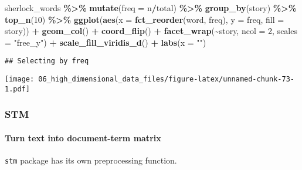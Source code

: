 \documentclass[
]{book}
\newenvironment{Shaded}{\begin{snugshade}}{\end{snugshade}}
\newcommand{\DataTypeTok}[1]{\textcolor[rgb]{0.13,0.29,0.53}{#1}}
\newcommand{\DecValTok}[1]{\textcolor[rgb]{0.00,0.00,0.81}{#1}}
\newcommand{\KeywordTok}[1]{\textcolor[rgb]{0.13,0.29,0.53}{\textbf{#1}}}
\newcommand{\NormalTok}[1]{#1}
\newcommand{\OperatorTok}[1]{\textcolor[rgb]{0.81,0.36,0.00}{\textbf{#1}}}
\newcommand{\OtherTok}[1]{\textcolor[rgb]{0.56,0.35,0.01}{#1}}
\newcommand{\StringTok}[1]{\textcolor[rgb]{0.31,0.60,0.02}{#1}}
\begin{document}
\begin{Shaded}
\begin{Highlighting}[]
\NormalTok{sherlock\_words }\OperatorTok{\%\textgreater{}\%}
\StringTok{  }\KeywordTok{mutate}\NormalTok{(}\DataTypeTok{freq =}\NormalTok{ n}\OperatorTok{/}\NormalTok{total) }\OperatorTok{\%\textgreater{}\%}
\StringTok{  }\KeywordTok{group\_by}\NormalTok{(story) }\OperatorTok{\%\textgreater{}\%}
\StringTok{  }\KeywordTok{top\_n}\NormalTok{(}\DecValTok{10}\NormalTok{) }\OperatorTok{\%\textgreater{}\%}
\StringTok{  }\KeywordTok{ggplot}\NormalTok{(}\KeywordTok{aes}\NormalTok{(}\DataTypeTok{x =} \KeywordTok{fct\_reorder}\NormalTok{(word, freq), }
             \DataTypeTok{y =}\NormalTok{ freq, }
             \DataTypeTok{fill =}\NormalTok{ story)) }\OperatorTok{+}
\StringTok{  }\KeywordTok{geom\_col}\NormalTok{() }\OperatorTok{+}
\StringTok{  }\KeywordTok{coord\_flip}\NormalTok{() }\OperatorTok{+}
\StringTok{  }\KeywordTok{facet\_wrap}\NormalTok{(}\OperatorTok{\textasciitilde{}}\NormalTok{story, }
             \DataTypeTok{ncol =} \DecValTok{2}\NormalTok{, }
             \DataTypeTok{scales =} \StringTok{"free\_y"}\NormalTok{) }\OperatorTok{+}
\StringTok{  }\KeywordTok{scale\_fill\_viridis\_d}\NormalTok{() }\OperatorTok{+}
\StringTok{  }\KeywordTok{labs}\NormalTok{(}\DataTypeTok{x =} \StringTok{""}\NormalTok{)}
\end{Highlighting}
\end{Shaded}

\begin{verbatim}
## Selecting by freq
\end{verbatim}

\texttt{[image: 06\_high\_dimensional\_data\_files/figure-latex/unnamed-chunk-73-1.pdf]}

\hypertarget{stm}{%
\subsubsection{STM}\label{stm}}

\hypertarget{turn-text-into-document-term-matrix}{%
\paragraph{Turn text into document-term matrix}\label{turn-text-into-document-term-matrix}}

\texttt{stm} package has its own preprocessing function.

\begin{Shaded}
\end{Shaded}
\end{document}
